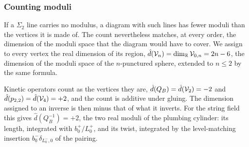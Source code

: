 \subsubsection{Counting moduli}
\label{p:sec:ws:moduli}

If a $\Sigma_2$ line carries no modulus, a diagram with such lines has fewer moduli than the vertices it is made of.
The count nevertheless matches, at every order, the dimension of the moduli space that the diagram would have to cover.
We assign to every vertex the real dimension of its region, $\hat d(\mathcal{V}_{n}) = \dim_{\mathbb{R}} \mathcal V_{0,n} = 2 n - 6$, the dimension of the moduli space of the $n$-punctured sphere, extended to $n \le 2$ by the same formula.

Kinetic operators count as the vertices they are, $\hat d(Q_B) = \hat d(\mathcal{V}_{2}) = - 2$ and $\hat d(p_{2,2}) = \hat d(\mathcal{V}_{4}) = + 2$, and the count is additive under gluing.
The dimension assigned to an inverse is then minus that of what it inverts.
For the string field this gives $\hat d(Q_B^{-1}) = + 2$, the two real moduli of the plumbing cylinder: its length, integrated with $b_0^+ / L_0^+$, and its twist, integrated by the level-matching insertion $b_0^- \delta_{L_0^-, 0}$ of the pairing.

